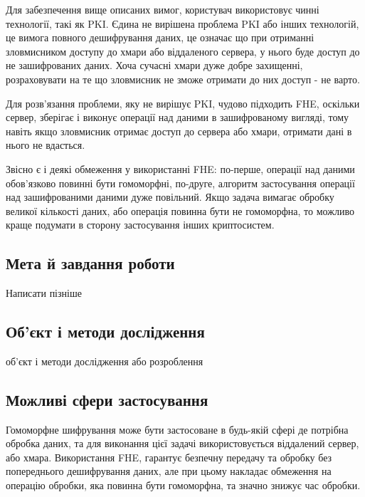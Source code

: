 Для забезпечення вище описаних вимог, користувач використовує чинні технології, такі
як PKI. Єдина не вирішена проблема PKI або інших технологій, це вимога повного
дешифрування даних, це означає що при отриманні зловмисником доступу до хмари або
віддаленого сервера, у нього буде доступ до не зашифрованих даних. Хоча сучасні хмари
дуже добре захищенні, розраховувати на те що зловмисник не зможе отримати до них
доступ - не варто. 

Для розв'язання проблеми, яку не вирішує PKI, чудово підходить FHE, оскільки сервер,
зберігає і виконує операції над даними в зашифрованому вигляді, тому навіть якщо
зловмисник отримає доступ до сервера або хмари, отримати дані в нього не вдасться.

Звісно є і деякі обмеження у використанні FHE: по-перше, операції над даними
обов'язково повинні бути гомоморфні, по-друге, алгоритм застосування операції над
зашифрованими даними дуже повільний. Якщо задача вимагає обробку великої кількості
даних, або операція повинна бути не гомоморфна, то можливо краще подумати в сторону
застосування інших криптосистем.

\subsection*{Мета й завдання роботи}
Написати пізніше
\subsection*{Об’єкт і методи дослідження}
об’єкт і методи дослідження або розроблення

\subsection*{Можливі сфери застосування}
Гомоморфне шифрування може бути застосоване в будь-якій сфері де потрібна обробка
даних, та для виконання цієї задачі використовується віддалений сервер, або хмара.
Використання FHE, гарантує безпечну передачу та обробку без попереднього дешифрування
даних, але при цьому накладає обмеження на операцію обробки, яка повинна бути
гомоморфна, та значно знижує час обробки.
